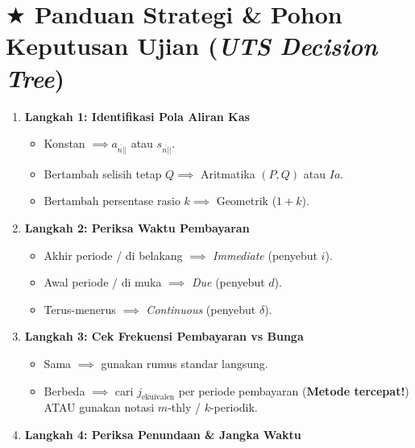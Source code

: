 \documentclass[10pt,a4paper]{article}
\newcommand{\angl}[1]{\overline{#1|}}
\begin{document}
\clearpage
\section*{\large $\bigstar$ Panduan Strategi \& Pohon Keputusan Ujian (\textit{UTS Decision Tree})}

\begin{teoremabox}
\begin{enumerate}[leftmargin=1.5em, topsep=1pt, itemsep=1pt]
    \item \textbf{Langkah 1: Identifikasi Pola Aliran Kas}
    \begin{itemize}[leftmargin=1.2em, topsep=0.5pt, itemsep=0.5pt]
        \item Konstan $\implies a_{\angl{n}|}$ atau $s_{\angl{n}|}$.
        \item Bertambah selisih tetap $Q \implies$ Aritmatika $(P, Q)$ atau $Ia$.
        \item Bertambah persentase rasio $k \implies$ Geometrik ($1+k$).
    \end{itemize}
    \item \textbf{Langkah 2: Periksa Waktu Pembayaran}
    \begin{itemize}[leftmargin=1.2em, topsep=0.5pt, itemsep=0.5pt]
        \item Akhir periode / di belakang $\implies$ \textit{Immediate} (penyebut $i$).
        \item Awal periode / di muka $\implies$ \textit{Due} (penyebut $d$).
        \item Terus-menerus $\implies$ \textit{Continuous} (penyebut $\delta$).
    \end{itemize}
    \item \textbf{Langkah 3: Cek Frekuensi Pembayaran vs Bunga}
    \begin{itemize}[leftmargin=1.2em, topsep=0.5pt, itemsep=0.5pt]
        \item Sama $\implies$ gunakan rumus standar langsung.
        \item Berbeda $\implies$ cari $j_{\text{ekuivalen}}$ per periode pembayaran (\textbf{Metode tercepat!}) ATAU gunakan notasi $m$-thly / $k$-periodik.
    \end{itemize}
    \item \textbf{Langkah 4: Periksa Penundaan \& Jangka Waktu}

\end{enumerate}
\end{teoremabox}
\end{document}
